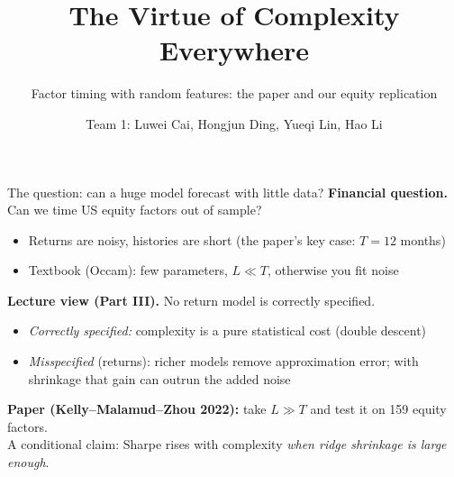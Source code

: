 \documentclass[aspectratio=169,10pt]{beamer}
\title{The Virtue of Complexity Everywhere}
\subtitle{Factor timing with random features: the paper and our equity replication}
\author{Team 1: Luwei Cai, Hongjun Ding, Yueqi Lin, Hao Li}
\institute{Deep Learning in Finance, Assignment 1\\Baruch MFE, Fall 2026}
\date{}
\newcommand{\spk}{}
\begin{document}
\maketitle
\addtocounter{framenumber}{1}

\renewcommand{\spk}{Presenter: Luwei Cai}
\begin{frame}{The question: can a huge model forecast with little data?}
\textbf{Financial question.} Can we time US equity factors out of sample?
\begin{itemize}
  \item Returns are noisy, histories are short (the paper's key case: $T=12$ months)
  \item Textbook (Occam): few parameters, $L\ll T$, otherwise you fit noise
\end{itemize}
\vspace{4pt}
\textbf{Lecture view (Part III).} No return model is correctly specified.
\begin{itemize}
  \item \emph{Correctly specified:} complexity is a pure statistical cost (double descent)
  \item \emph{Misspecified} (returns): richer models remove approximation error; with shrinkage that gain can outrun the added noise
\end{itemize}
\vspace{4pt}
\textbf{Paper (Kelly--Malamud--Zhou 2022):} take $L\gg T$ and test it on 159 equity factors.\\
\alert{A conditional claim:} Sharpe rises with complexity \emph{when ridge shrinkage is large enough}.
\end{frame}
\end{document}
